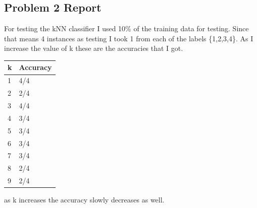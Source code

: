 \documentclass[letter]{article}
\theoremstyle{case}
\begin{document}
\subsection*{Problem 2 Report}
For testing the kNN classifier I used 10\% of the training data for testing. Since that means 4 instances as testing I took 1 from each of the labels \{1,2,3,4\}. As I increase the value of k these are the accuracies that I got.
\begin{table}[!h]
\begin{tabular}{|l|l|}
\hline
\multicolumn{1}{|c|}{k} & Accuracy \\ \hline
1                       & 4/4      \\ \hline
2                       & 2/4      \\ \hline
3                       & 4/4      \\ \hline
4                       & 3/4      \\ \hline
5                       & 3/4      \\ \hline
6                       & 3/4      \\ \hline
7                       & 3/4      \\ \hline
8                       & 2/4      \\ \hline
9                       & 2/4      \\ \hline
\end{tabular}
\end{table}
as k increases the accuracy slowly decreases as well. 
\end{document}
